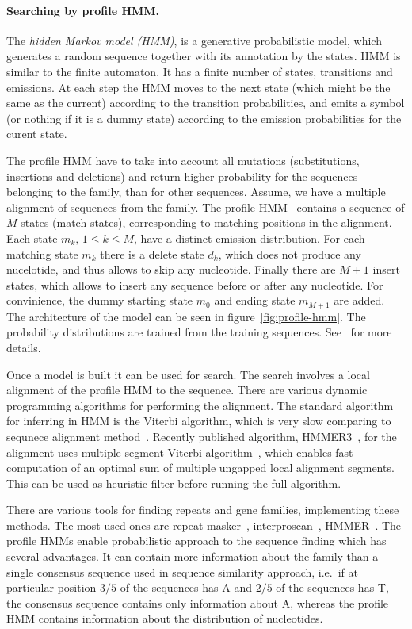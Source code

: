 \paragraph{Searching by profile HMM.}
The \emph{hidden Markov model (HMM)}, is a generative probabilistic model, which generates a random sequence together with its annotation by the states. HMM is similar to the finite automaton. It has a finite number of states, transitions and emissions. At each step the HMM moves to the next state (which might be the same as the current) according to the transition probabilities, and emits a symbol (or nothing if it is a dummy state) according to the emission probabilities for the curent state.

The profile HMM have to take into account all mutations (substitutions, insertions and deletions) and return higher probability for the sequences belonging to the family, than for other sequences.
Assume, we have a multiple alignment of sequences from the family. The profile HMM~\cite{profile-hmm} contains a sequence of $M$ states (match states), corresponding to matching positions in the alignment. Each state $m_k,\, 1 \leq k \leq M$, have a distinct emission distribution.
For each matching state $m_k$ there is a delete state $d_k$, which does not produce any nucelotide, and thus allows to skip any nucleotide. Finally there are $M+1$ insert states, which allows to insert any sequence before or after any nucleotide. For convinience, the dummy starting state $m_0$ and ending state $m_{M+1}$ are added.
The architecture of the model can be seen in figure~\ref{fig:profile-hmm}. The probability distributions are trained from the training sequences. See~\cite{profile-hmm} for more details.

Once a model is built it can be used for search. The search involves a local alignment of the profile HMM to the sequence.
There are various dynamic programming algorithms for performing the alignment. The standard algorithm for inferring in HMM is the Viterbi algorithm, which is very slow comparing to sequnece alignment method~\cite{eddy2011accelerated}. Recently published algorithm, HMMER3~\cite{eddy2011accelerated}, for the alignment uses multiple segment Viterbi algorithm~\cite{eddy2011accelerated}, which enables fast computation of an optimal sum of multiple ungapped local
alignment segments. This can be used as heuristic filter before running the full algorithm.

There are various tools for finding repeats and gene families, implementing these methods.
The most used ones are repeat masker~\cite{repeatmasker}, interproscan~\cite{mitchell2015interpro}, HMMER~\cite{eddy2011accelerated}.
The profile HMMs enable probabilistic approach to the sequence finding which has several advantages. It can contain more information about the family than a single consensus sequence used in sequence similarity approach, i.e.\ if at particular position $3/5$ of the sequences has A and $2/5$ of the sequences has T, the consensus sequence contains only information about A, whereas the profile HMM contains information about the distribution of nucleotides.

